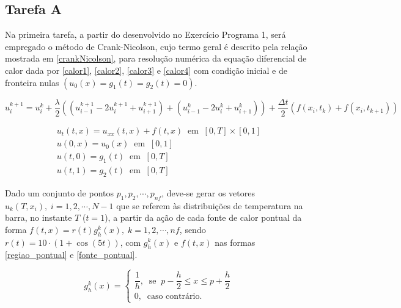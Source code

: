 \documentclass[12pt]{article}
\begin{document}
\tableofcontents 
\clearpage
\begin{spacing}{1.5}

\section{Tarefa A}

Na primeira tarefa, a partir do desenvolvido no Exercício Programa 1, será empregado o método de Crank-Nicolson, cujo termo geral é descrito pela relação mostrada em \eqref{crankNicolson}, para resolução numérica da equação diferencial de calor dada por \eqref{calor1}, \eqref{calor2}, \eqref{calor3} e \eqref{calor4} com condição inicial e de fronteira nulas $\left(u_0(x) = g_1(t) = g_2(t) = 0 \right)$.

\begin{equation} \label{crankNicolson}
u_{i}^{k+1} = u_i^k + \dfrac{\lambda}{2}((u^{k+1}_{i-1} - 2u^{k+1}_{i} + u_{i+1}^{k+1}) + (u^{k}_{i-1} -2u^{k}_i + u^k_{i+1})) + \dfrac{\Delta t}{2}(f(x_i,t_k) + f(x_{i},t_{k+1}))
\end{equation}

\begin{gather}
u_{t}(t,x) = u_{x x}(t,x) + f(t,x) \;\; \text{em} \;\; [0,T]\times[0,1] \label{calor1}\\
u(0,x)=u_0(x) \;\;\text{em}\;\; [0,1] \label{calor2}\\
u(t,0)=g_1(t) \;\;\text{em}\;\; [0,T] \label{calor3}\\
u(t,1)=g_2(t) \;\;\text{em}\;\; [0,T] \label{calor4}
\end{gather}


Dado um conjunto de pontos $p_1, p_2, \cdots, p_{n f}$, deve-se gerar os vetores $u_k(T,x_i),\;i = 1, 2, \cdots, N - 1 $ que se referem às distribuições de temperatura na barra, no instante $T$ ($t=1$), a partir da ação de cada fonte de calor pontual da forma $f(t,x)=r(t)g_h^k(x),\; k = 1, 2, \cdots, nf$, sendo $r(t) = 10\cdot(1+\cos(5t))$, com $g_h^k(x)$ e $f(t,x)$ nas formas \eqref{regiao_pontual} e \eqref{fonte_pontual}. 

\begin{equation}\label{regiao_pontual}
g_{h}^k(x) =\begin{cases}
    \dfrac{1}{h},\;\; \text{se} \;\; p-\dfrac{h}{2} \leq x \leq p + \dfrac{h}{2} \\
    0,\;\; \text{caso contrário.}
\end{cases}
\end{equation}


\end{spacing}
\end{document}
